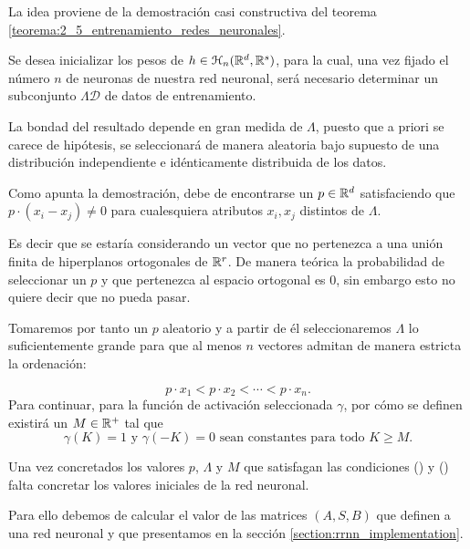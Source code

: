 \begin{aportacionOriginal} %
    
La idea proviene de la demostración casi constructiva del teorema \ref{teorema:2_5_entrenamiento_redes_neuronales}.

Se desea inicializar los pesos de $h \in \mathcal{H}_n(\mathbb{R}^d,\mathbb{R}^s)$, para la cual, una vez fijado el número $n$ de neuronas de nuestra red neuronal, será necesario  determinar un subconjunto $\Lambda \mathcal{D}$ de datos de entrenamiento. 

La bondad del resultado depende en gran medida de $\Lambda$, 
puesto que a priori se carece de hipótesis, se seleccionará 
de manera aleatoria bajo supuesto de una distribución 
independiente e idénticamente distribuida de los datos. 

Como apunta la demostración, debe de encontrarse un 
$p \in \mathbb{R}^d$ satisfaciendo que $p \cdot (x_i-x_j) \neq 0$ para cualesquiera
atributos $x_i,x_j$ distintos de $\Lambda$.  

Es decir que se estaría considerando un vector que no 
pertenezca a una unión finita de hiperplanos ortogonales de $\mathbb{R}^r$. 
De manera teórica la probabilidad de seleccionar un $p$ y 
que pertenezca al espacio ortogonal es $0$, sin embargo esto 
no quiere decir que no pueda pasar. 

Tomaremos por tanto un $p$ aleatorio y a partir de él 
seleccionaremos $\Lambda$ lo suficientemente grande para que
 al menos $n$ vectores admitan de manera estricta la ordenación: 

\begin{equation}\label{eq:method_inicializar_condition_desigualdad}
    p \cdot x_1 < 
    p \cdot x_2 
    < \cdots <
    p \cdot x_n.
\end{equation}
Para continuar, para la función de activación 
seleccionada $\gamma$, por cómo se definen 
existirá un $M \in \mathbb{R}^+$ tal que 
\begin{equation} \label{eq:method_inicializar_M}
    \gamma(K)=1 \text{ y } \gamma(-K)=0 
    \text{ sean constantes para todo }K \geq M.
\end{equation}

Una vez concretados los valores $p$, $\Lambda$ y $M$ que satisfagan las condiciones 
() 
y ()  
falta concretar los valores iniciales de la red neuronal. 

Para ello debemos de calcular el valor de las matrices $(A,S,B)$ que definen a una red neuronal y que presentamos en la sección \ref{section:rrnn_implementation}.


\end{aportacionOriginal}
